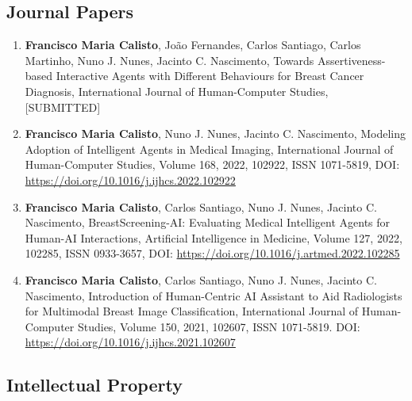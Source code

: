 \subsection{Journal Papers}
\label{sec:chap00100602}

\begin{enumerate}
\item {\bf Francisco Maria Calisto}, Jo\~{a}o Fernandes, Carlos Santiago, Carlos Martinho, Nuno J. Nunes, Jacinto C. Nascimento, Towards Assertiveness-based Interactive Agents with Different Behaviours for Breast Cancer Diagnosis, International Journal of Human-Computer Studies, [SUBMITTED]
\item {\bf Francisco Maria Calisto}, Nuno J. Nunes, Jacinto C. Nascimento, Modeling Adoption of Intelligent Agents in Medical Imaging, International Journal of Human-Computer Studies, Volume 168, 2022, 102922, ISSN 1071-5819, DOI: \href{https://doi.org/10.1016/j.ijhcs.2022.102922}{https://doi.org/10.1016/j.ijhcs.2022.102922}
\item {\bf Francisco Maria Calisto}, Carlos Santiago, Nuno J. Nunes, Jacinto C. Nascimento, BreastScreening-AI: Evaluating Medical Intelligent Agents for Human-AI Interactions, Artificial Intelligence in Medicine, Volume 127, 2022, 102285, ISSN 0933-3657, DOI: \href{https://doi.org/10.1016/j.artmed.2022.102285}{https://doi.org/10.1016/j.artmed.2022.102285}
\item {\bf Francisco Maria Calisto}, Carlos Santiago, Nuno J. Nunes, Jacinto C. Nascimento, Introduction of Human-Centric AI Assistant to Aid Radiologists for Multimodal Breast Image Classification, International Journal of Human-Computer Studies, Volume 150, 2021, 102607, ISSN 1071-5819. DOI: \href{https://doi.org/10.1016/j.ijhcs.2021.102607}{https://doi.org/10.1016/j.ijhcs.2021.102607}
\end{enumerate}

\subsection{Intellectual Property}
\label{sec:chap00100603}

